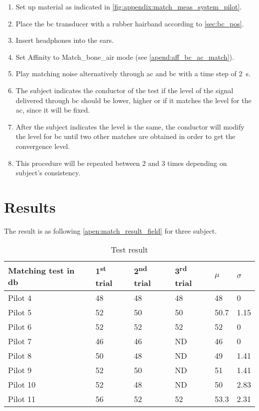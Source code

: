 \begin{enumerate}
\item Set up material as indicated in \autoref{fig:appendix:match_meas_system_pilot}.
\item Place the \gls{bc} transducer with a rubber hairband according to \autoref{sec:bc_pos}.
\item Insert headphones into the ears.
\item Set Affinity to Match_bone_air mode (see \autoref{apend:aff_bc_ac_match}).
\item Play matching noise alternatively through \gls{ac} and \gls{bc} with a time step of \SI{2}{\second}.
\item The  subject indicates the conductor of the test if the level of the signal delivered through \gls{bc} should be lower, higher or if it matches the level for the \gls{ac}, since it will be fixed.
\item After the subject indicates the level is the same, the conductor will modify the level for \gls{bc} until two other matches are obtained in order to get the convergence level.
\item This procedure will be repeated between 2 and 3 times depending on subject's consistency.
\end{enumerate}

\section*{Results}

The result is as following \autoref{apen:match_result_field} for three subject. 

\begin{table}[H]
\centering
\caption{Test result}
\begin{tabular}{l|lll|ll}
Matching test in \si{\decibel}   & 1\textsuperscript{st} trial & 2\textsuperscript{nd} trial & 3\textsuperscript{rd} trial & $\mu$ & $\sigma$ \\ \hline
Pilot 4  & 48          & 48           & 48          & 48          & 0                  \\
Pilot 5  & 52          & 50           & 50          & 50.7        & 1.15               \\
Pilot 6  & 52          & 52           & 52          & 52          & 0                  \\
Pilot 7  & 46          & 46           & ND          & 46          & 0                  \\
Pilot 8  & 50          & 48           & ND          & 49          & 1.41               \\
Pilot 9  & 52          & 50           & ND          & 51          & 1.41               \\
Pilot 10 & 52          & 48           & ND          & 50          & 2.83               \\
Pilot 11 & 56          & 52           & 52          & 53.3        & 2.31             
\end{tabular}
\label{apen:match_result_field}
\end{table}

